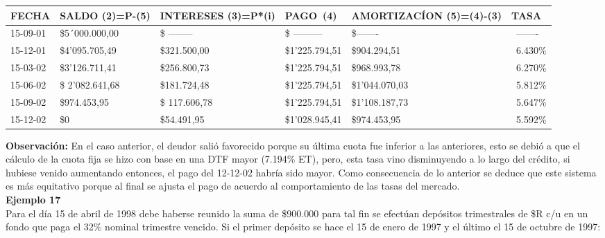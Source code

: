 \begin{spacing}{1.1}
    \begin{center}
        \begin{tabular}{|p{1.5cm}|p{2.5cm}|p{2cm}|p{2cm}|p{3.5cm}|p{1.5cm}|}
        \hline 
        \rowcolor{white!50}
            \textbf{FECHA} & \textbf{SALDO (2)=P-(5)} & \textbf{INTERESES  (3)=P*(i)}& \textbf{PAGO\ (4)}& \textbf{AMORTIZACÍON  (5)=(4)-(3)}& \textbf{TASA} \\ \hline                        

           
            15-09-01 & \$5´000.000,00  &\$ -------- & \$ ---------  & \$------- &\  ------- \\ \hline
            15-12-01 & \$4'095.705,49  &\$321.500,00 & \$1'225.794,51  & \$904.294,51 &\ 6.430\% \\ \hline
            15-03-02 & \$3'126.711,41  &\$256.800,73  & \$1'225.794,51  & \$968.993,78 &\ 6.270\% \\ \hline
            15-06-02 & \$ 2'082.641,68 &\$181.724,48 & \$1'225.794,51  & \$1'044.070,03&\ 5.812\% \\ \hline
            15-09-02 & \$974.453,95  &\$ 117.606,78& \$1'225.794,51  & \$1'108.187,73 &\ 5.647\% \\ \hline
            15-12-02 & \$0  &\$54.491,95 & \$1'028.945,41   & \$974.453,95 &\ 5.592\% \\ \hline
\end{tabular}
\end{center}
\end{spacing}

\textbf{Observación:} En el caso anterior, el deudor salió favorecido porque su última cuota fue inferior a las anteriores, esto se debió a que el cálculo de la cuota fija se hizo con base en una DTF mayor (7.194\% ET), pero, esta tasa vino disminuyendo a lo largo del crédito, si hubiese venido aumentando entonces, el pago del 12-12-02 habría sido mayor. Como consecuencia de lo anterior se deduce que este sistema es más equitativo porque al final se ajusta el pago de acuerdo al comportamiento de las tasas del mercado.\\

\textbf{Ejemplo 17}\\
Para el día 15 de abril de 1998 debe haberse reunido la suma de \$900.000 para tal fin se efectúan depósitos trimestrales de \$R c/u en un fondo que paga el 32\% nominal trimestre vencido. Si el primer depósito se hace el 15 de enero de 1997 y el último el 15 de octubre de 1997:\\

